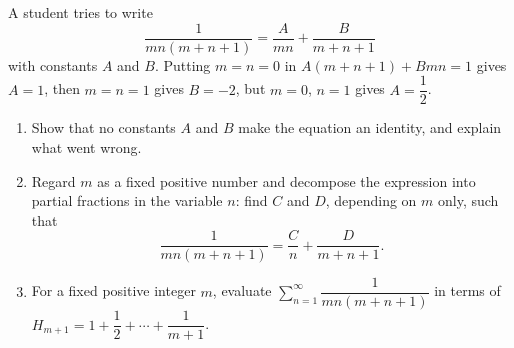 A student tries to write
\[\dfrac{1}{mn(m+n+1)}=\dfrac{A}{mn}+\dfrac{B}{m+n+1}\]
with constants $A$ and $B$. Putting $m=n=0$ in $A(m+n+1)+Bmn=1$ gives $A=1$, then $m=n=1$ gives $B=-2$, but $m=0$, $n=1$ gives $A=\dfrac{1}{2}$.
\begin{enumerate}
\item[(a)] Show that no constants $A$ and $B$ make the equation an identity, and explain what went wrong.
\item[(b)] Regard $m$ as a fixed positive number and decompose the expression into partial fractions in the variable $n$: find $C$ and $D$, depending on $m$ only, such that
\[\dfrac{1}{mn(m+n+1)}=\dfrac{C}{n}+\dfrac{D}{m+n+1}.\]
\item[(c)] For a fixed positive integer $m$, evaluate $\displaystyle\sum_{n=1}^{\infty}\dfrac{1}{mn(m+n+1)}$ in terms of $H_{m+1}=1+\dfrac{1}{2}+\cdots+\dfrac{1}{m+1}$.
\end{enumerate}
